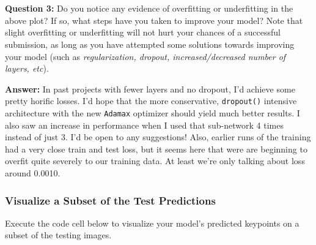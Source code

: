\documentclass[11pt]{article}
\begin{document}
    \begin{center}
    \end{center}
    { \hspace*{\fill} \\}
    
    \begin{center}
    \end{center}
    { \hspace*{\fill} \\}
    
    \textbf{Question 3:} Do you notice any evidence of overfitting or
underfitting in the above plot? If so, what steps have you taken to
improve your model? Note that slight overfitting or underfitting will
not hurt your chances of a successful submission, as long as you have
attempted some solutions towards improving your model (such as
\emph{regularization, dropout, increased/decreased number of layers,
etc}).

\textbf{Answer:} In past projects with fewer layers and no dropout, I'd
achieve some pretty horific losses. I'd hope that the more conservative,
\texttt{dropout()} intensive architecture with the new \texttt{Adamax}
optimizer should yield much better results. I also saw an increase in
performance when I used that sub-network 4 times instead of just 3. I'd
be open to any suggestions! Also, earlier runs of the training had a
very close train and test loss, but it seems here that were are
beginning to overfit quite severely to our training data. At least we're
only talking about loss around 0.0010.

    \subsubsection{Visualize a Subset of the Test
Predictions}\label{visualize-a-subset-of-the-test-predictions}

Execute the code cell below to visualize your model's predicted
keypoints on a subset of the testing images.
\end{document}
